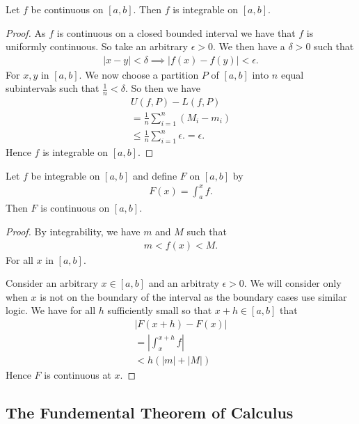 \documentclass[]{article}
\begin{document}
\begin{thm}
		Let $f$ be continuous on $[a,b]$. Then $f$ is integrable on $[a,b]$.
\end{thm}

\begin{proof}
		As $f$ is continuous on a closed bounded interval we have that $f$ is uniformly continuous.	So take an arbitrary $\epsilon > 0$. We then have a $\delta > 0$ such that
		\begin{align*}
				|x - y| < \delta \implies |f(x) - f(y)| < \epsilon.
		\end{align*}
		For $x,y$ in $[a,b]$. We now choose a partition $P$ of $[a,b]$ into $n$ equal subintervals such that $\frac{1}{n} < \delta$. So then we have
		\begin{align*}
				U(f,P) - L(f,P) \\
				= \frac{1}{n} \sum_{i=1}^n (M_i - m_i) \\
				\leq \frac{1}{n} \sum_{i=1}^n \epsilon.
				= \epsilon.
		\end{align*}
		Hence $f$ is integrable on $[a,b ]$.
\end{proof}

\begin{thm}
		Let $f $ be integrable on $[a,b]$ and define $F$ on $[a,b]$ by
		\begin{align*}
				F(x) = \int_a^x f.
		\end{align*}
		Then $F$ is continuous on $[a,b]$.
\end{thm}

\begin{proof}
		By integrability, we have $m$ and $M$ such that
		\begin{align*}
				m < f(x) < M.
		\end{align*}
		For all $x$ in $[a,b]$.

		Consider an arbitrary $x \in [a,b]$ and an arbitraty $\epsilon > 0$. We will consider only when $x$ is not on the boundary of the interval as the boundary cases use similar logic. We have for all $h$ sufficiently small so that $x+h \in [a,b]$ that
		\begin{align*}
				|F(x+h) - F(x)| \\
				= |\int_x^{x+h}f| \\
				< h(|m| + |M|)
		\end{align*}
		Hence $F$ is continuous at $x$.
\end{proof}

\subsection{The Fundemental Theorem of Calculus}
\end{document}

